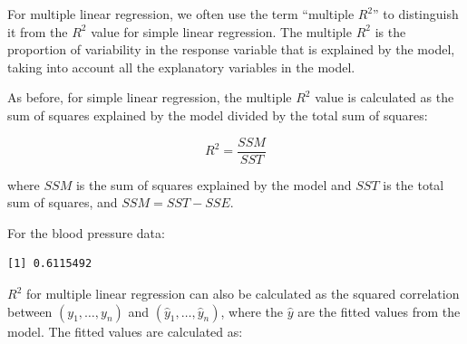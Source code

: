 \documentclass[
  letterpaper,
  8pt,
  a4paper]{book}
\newenvironment{Shaded}{\begin{snugshade}}{\end{snugshade}}
\newcommand{\AttributeTok}[1]{\textcolor[rgb]{0.40,0.45,0.13}{#1}}
\newcommand{\CommentTok}[1]{\textcolor[rgb]{0.37,0.37,0.37}{#1}}
\newcommand{\DecValTok}[1]{\textcolor[rgb]{0.68,0.00,0.00}{#1}}
\newcommand{\FunctionTok}[1]{\textcolor[rgb]{0.28,0.35,0.67}{#1}}
\newcommand{\NormalTok}[1]{\textcolor[rgb]{0.00,0.23,0.31}{#1}}
\newcommand{\OtherTok}[1]{\textcolor[rgb]{0.00,0.23,0.31}{#1}}
\newcommand{\SpecialCharTok}[1]{\textcolor[rgb]{0.37,0.37,0.37}{#1}}
\newcommand{\StringTok}[1]{\textcolor[rgb]{0.13,0.47,0.30}{#1}}
\begin{document}
For multiple linear regression, we often use the term ``multiple
\(R^2\)'' to distinguish it from the \(R^2\) value for simple linear
regression. The multiple \(R^2\) is the proportion of variability in the
response variable that is explained by the model, taking into account
all the explanatory variables in the model.

As before, for simple linear regression, the multiple \(R^2\) value is
calculated as the sum of squares explained by the model divided by the
total sum of squares:

\[R^2 = \frac{SSM}{SST}\]

\begin{Shaded}
\end{Shaded}

where \(SSM\) is the sum of squares explained by the model and \(SST\)
is the total sum of squares, and \(SSM = SST - SSE\).

For the blood pressure data:

\begin{Shaded}
\end{Shaded}

\begin{verbatim}
[1] 0.6115492
\end{verbatim}

\(R^2\) for multiple linear regression can also be calculated as the
squared correlation between \((y_1,\ldots,y_n)\) and
\((\hat{y}_1,\ldots,\hat{y}_n)\), where the \(\hat y\) are the fitted
values from the model. The fitted values are calculated as:
\end{document}
